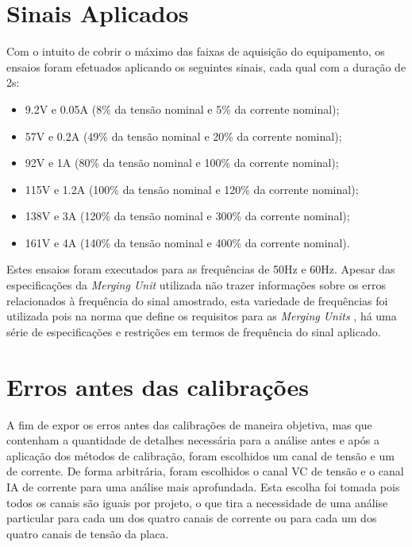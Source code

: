 \section{Sinais Aplicados}

Com o intuito de cobrir o máximo das faixas de aquisição do equipamento, os ensaios foram efetuados aplicando os seguintes sinais, cada qual com a duração de 2s:

\begin{itemize}
    \item 9.2V e 0.05A (8\% da tensão nominal e 5\% da corrente nominal);
    \item 57V e 0.2A (49\% da tensão nominal e 20\% da corrente nominal);
    \item 92V e 1A (80\% da tensão nominal e 100\% da corrente nominal);
    \item 115V e 1.2A (100\% da tensão nominal e 120\% da corrente nominal);
    \item 138V e 3A (120\% da tensão nominal e 300\% da corrente nominal);
    \item 161V e 4A (140\% da tensão nominal e 400\% da corrente nominal).
\end{itemize}

Estes ensaios foram executados para as frequências de 50Hz e 60Hz. Apesar das especificações da \textit{Merging Unit} utilizada não trazer informações sobre os erros relacionados à frequência do sinal amostrado, esta variedade de frequências foi utilizada pois na norma que define os requisitos para as \textit{Merging Units} \cite{IEC61869-13}, há uma série de especificações e restrições em termos de frequência do sinal aplicado.

\section{Erros antes das calibrações}

A fim de expor os erros antes das calibrações de maneira objetiva, mas que contenham a quantidade de detalhes necessária para a análise antes e após a aplicação dos métodos de calibração, foram escolhidos um canal de tensão e um de corrente. De forma arbitrária, foram escolhidos o canal VC de tensão e o canal IA de corrente para uma análise mais aprofundada. Esta escolha foi tomada pois todos os canais são iguais por projeto, o que tira a necessidade de uma análise particular para cada um dos quatro canais de corrente ou para cada um dos quatro canais de tensão da placa.

